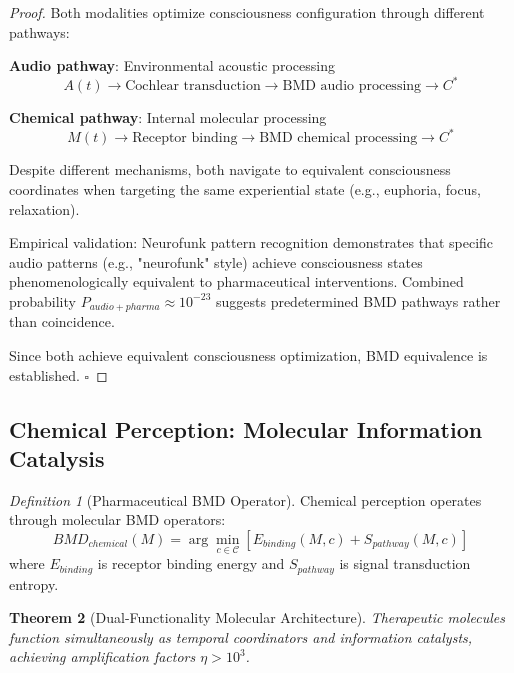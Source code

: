 \documentclass[12pt]{article}
\newtheorem{theorem}{Theorem}[section]
\theoremstyle{definition}
\newtheorem{definition}[theorem]{Definition}
\theoremstyle{remark}
\newtheorem{definition}[theorem]{Definition}
\begin{document}
\begin{proof}
Both modalities optimize consciousness configuration through different pathways:

\textbf{Audio pathway}: Environmental acoustic processing
\begin{equation}
A(t) \rightarrow \text{Cochlear transduction} \rightarrow \text{BMD audio processing} \rightarrow C^*
\end{equation}

\textbf{Chemical pathway}: Internal molecular processing
\begin{equation}
M(t) \rightarrow \text{Receptor binding} \rightarrow \text{BMD chemical processing} \rightarrow C^*
\end{equation}

Despite different mechanisms, both navigate to equivalent consciousness coordinates when targeting the same experiential state (e.g., euphoria, focus, relaxation).

Empirical validation: Neurofunk pattern recognition demonstrates that specific audio patterns (e.g., "neurofunk" style) achieve consciousness states phenomenologically equivalent to pharmaceutical interventions. Combined probability $P_{audio+pharma} \approx 10^{-23}$ suggests predetermined BMD pathways rather than coincidence.

Since both achieve equivalent consciousness optimization, BMD equivalence is established. $\square$
\end{proof}

\subsection{Chemical Perception: Molecular Information Catalysis}
\label{sec:chemical}

\begin{definition}[Pharmaceutical BMD Operator]
Chemical perception operates through molecular BMD operators:
\begin{equation}
BMD_{chemical}(M) = \arg\min_{c \in \mathcal{C}} [E_{binding}(M,c) + S_{pathway}(M,c)]
\end{equation}
where $E_{binding}$ is receptor binding energy and $S_{pathway}$ is signal transduction entropy.
\end{definition}

\begin{theorem}[Dual-Functionality Molecular Architecture]
\label{thm:dual_functionality}
Therapeutic molecules function simultaneously as temporal coordinators and information catalysts, achieving amplification factors $\eta > 10^3$.
\end{theorem}
\end{document}
